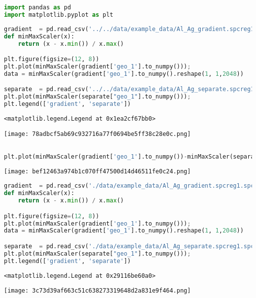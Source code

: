 \begin{lstlisting}[language=Python]
import pandas as pd
import matplotlib.pyplot as plt
\end{lstlisting}

\begin{lstlisting}[language=Python]
gradient  = pd.read_csv('../../data/example_data/Al_Ag_gradient.spcreg1.spc', sep='\s+')
def minMaxScaler(x):
    return (x - x.min()) / x.max()

plt.figure(figsize=(12, 8))
plt.plot(minMaxScaler(gradient['geo_1'].to_numpy()));
data = minMaxScaler(gradient['geo_1'].to_numpy().reshape(1, 1,2048))

separate  = pd.read_csv('../../data/example_data/Al_Ag_separate.spcreg1.spc', sep='\s+')
plt.plot(minMaxScaler(separate["geo_1"].to_numpy()));
plt.legend(['gradient', 'separate'])
\end{lstlisting}

\begin{lstlisting}
<matplotlib.legend.Legend at 0x1ea2cf67bb0>
\end{lstlisting}

\texttt{[image: 78adbcf5ab69c932716a77f0694be5ff38c28e0c.png]}

\begin{lstlisting}[language=Python]

plt.plot(minMaxScaler(gradient['geo_1'].to_numpy())-minMaxScaler(separate["geo_1"].to_numpy()));
\end{lstlisting}

\texttt{[image: bef12463a974b1c070ff47500d14d46511fe0c24.png]}

\begin{lstlisting}[language=Python]
gradient  = pd.read_csv('./data/example_data/Al_Ag_gradient.spcreg1.spc', sep='\s+')
def minMaxScaler(x):
    return (x - x.min()) / x.max()

plt.figure(figsize=(12, 8))
plt.plot(minMaxScaler(gradient['geo_1'].to_numpy()));
data = minMaxScaler(gradient['geo_1'].to_numpy().reshape(1, 1,2048))

separate  = pd.read_csv('./data/example_data/Al_Ag_separate.spcreg1.spc', sep='\s+')
plt.plot(minMaxScaler(separate["geo_1"].to_numpy()));
plt.legend(['gradient', 'separate'])
\end{lstlisting}

\begin{lstlisting}
<matplotlib.legend.Legend at 0x29116be60a0>
\end{lstlisting}

\texttt{[image: 3c73d39af663c51c638273319648d2a831e9f464.png]}
